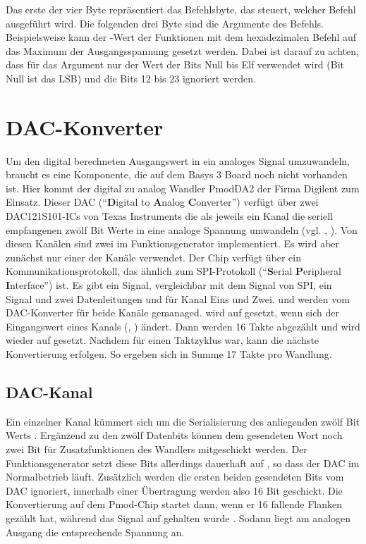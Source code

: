 Das erste der vier Byte repräsentiert das Befehlsbyte, das steuert, welcher Befehl ausgeführt wird.
Die folgenden drei Byte sind die Argumente des Befehls.
Beispielsweise kann der -Wert der Funktionen mit dem hexadezimalen Befehl  auf das Maximum der Ausgangsspannung gesetzt werden.
Dabei ist darauf zu achten, dass für das Argument nur der Wert der Bits Null bis Elf verwendet wird (Bit Null ist das LSB) und die Bits 12 bis 23 ignoriert werden.

\section{DAC-Konverter} \label{Comp:DAC}
Um den digital berechneten Ausgangswert in ein analoges Signal umzuwandeln, braucht es eine Komponente, die auf dem Basys 3 Board noch nicht vorhanden ist.
Hier kommt der digital zu analog Wandler PmodDA2 der Firma Digilent zum Einsatz.
Dieser DAC (``\textbf{D}igital to \textbf{A}nalog \textbf{C}onverter'') verfügt über zwei DAC121S101-ICs von Texas Instruments die als jeweils ein Kanal die seriell empfangenen zwölf Bit Werte in eine analoge Spannung umwandeln (vgl. \cite{DAC121S101}, \cite{PmodDA2}).
Von diesen Kanälen sind zwei im Funktionsgenerator implementiert.
Es wird aber zunächst nur einer der Kanäle verwendet.
Der Chip verfügt über ein Kommunikationsprotokoll, das ähnlich zum SPI-Protokoll (``\textbf{S}erial \textbf{P}eripheral \textbf{I}nterface'') ist.
Es gibt ein  Signal, vergleichbar mit dem  Signal von SPI, ein  Signal und zwei Datenleitungen  und  für Kanal Eins und Zwei.
 und  werden vom DAC-Konverter für beide Kanäle gemanaged.
 wird auf  gesetzt, wenn sich der Eingangswert eines Kanals (, ) ändert.
Dann werden 16 Takte abgezählt und  wird wieder auf  gesetzt.
Nachdem  für einen Taktzyklus  war, kann die nächste Konvertierung erfolgen.
So ergeben sich in Summe 17 Takte pro Wandlung.

\subsection{DAC-Kanal} \label{Comp:DAC:Channel}
Ein einzelner Kanal kümmert sich um die Serialisierung des anliegenden zwölf Bit Werts .
Ergänzend zu den zwölf Datenbits können dem gesendeten Wort noch zwei Bit für Zusatzfunktionen des Wandlers mitgeschickt werden.
Der Funktionsgenerator setzt diese Bits allerdings dauerhaft auf , so dass der DAC im Normalbetrieb läuft.
Zusätzlich werden die ersten beiden gesendeten Bits vom DAC ignoriert, innerhalb einer Übertragung werden also 16 Bit geschickt.
Die Konvertierung auf dem Pmod-Chip startet dann, wenn er 16 fallende  Flanken gezählt hat, während das  Signal auf  gehalten wurde \cite{DAC121S101}.
Sodann liegt am analogen Ausgang die entsprechende Spannung an.

